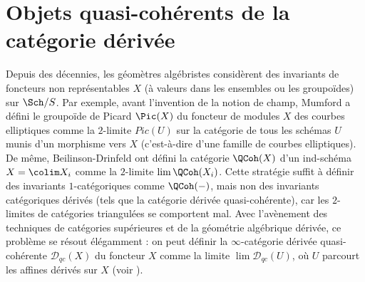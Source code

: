 \section{Objets quasi-cohérents de la catégorie dérivée}
\label{section-QC}

\noindent
Depuis des décennies, les géomètres algébristes considèrent des invariants de
foncteurs non représentables $X$ (à valeurs dans les ensembles ou les groupoïdes) sur $\Sch/S$.
Par exemple,
avant l'invention de la notion de champ, Mumford a défini \cite{mumford_picard}
le groupoïde de Picard $\Pic(X)$ du foncteur de modules $X$ des courbes elliptiques
comme la $2$-limite $Pic(U)$ sur la catégorie de tous les schémas $U$
munis d'un morphisme vers $X$ (c'est-à-dire d'une famille de courbes elliptiques).
De même, Beilinson-Drinfeld ont défini \cite{BVGD} la catégorie
$\QCoh(X)$ d'un ind-schéma $X = \colim X_i$ comme la $2$-limite
$\lim \QCoh(X_i)$.
Cette stratégie suffit à définir des invariants $1$-catégoriques
comme $\QCoh(-)$, mais non des invariants catégoriques dérivés
(tels que la catégorie dérivée quasi-cohérente), car les $2$-limites
de catégories triangulées se comportent mal.
Avec l'avènement des techniques de catégories supérieures
et de la géométrie algébrique dérivée, ce problème se
résout élégamment : on peut définir la $\infty$-catégorie dérivée
quasi-cohérente $\mathcal{D}_{qc}(X)$ du foncteur $X$
comme la limite $\lim \mathcal{D}_{qc}(U)$, où $U$
parcourt les affines dérivés sur $X$ (voir \cite{lurie-thesis}).

